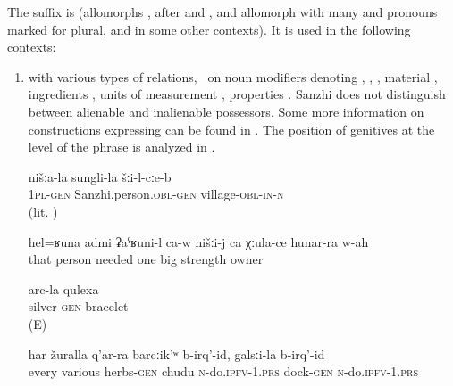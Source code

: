 The  suffix is  (allomorphs ,  after  and , and allomorph  with many  and pronouns marked for plural, and in some other contexts). It is used in the following contexts:

\begin{enumerate}
	\item	with various types of relations, \teg\ on noun modifiers denoting  , , , material , ingredients , units of measurement , properties . Sanzhi does not distinguish between alienable and inalienable possessors. Some more information on constructions expressing  can be found in . The position of genitives at the level of the phrase is analyzed in .
	\begin{exe}
	
		\ex	\label{ex:in our village of Sanzhi}
		\gll	nišːa-la	sungli-la	šːi-l-cːe-b\\
			\textsc{1pl-gen}	Sanzhi.person.\textsc{obl}-\textsc{gen}	village-\textsc{obl-in}-\textsc{n}\\
		\glt	{} (lit. )
		
		
	\ex	\label{ex:‎We need such a man, one with huge strength}
	\gll	hel=ʁuna	admi	ʡaˁʁuni-l	ca-w	nišːi-j	ca	χːula-ce	hunar-ra w-ah\\
		that	person	needed				one	big	strength	owner\\
	\glt	{}
		
		
		\ex	\label{ex:silver bracelet}
		\gll	arc-la qulexa\\
			silver-\textsc{gen} bracelet\\
		\glt	{} (E)

		\ex	\label{ex:We make chudu from all various herbs, we make it from dock}
		\gll	har	žuralla	q'ar-ra	barcːik'ʷ	b-irq'-id,	galsːi-la	b-irq'-id\\
			every	various	herbs-\textsc{gen}	chudu	\textsc{n}-do.\textsc{ipfv}-1.\textsc{prs}	dock-\textsc{gen}	\textsc{n}-do.\textsc{ipfv}-1.\textsc{prs}\\
		\glt	{}


\end{exe}
\end{enumerate}
